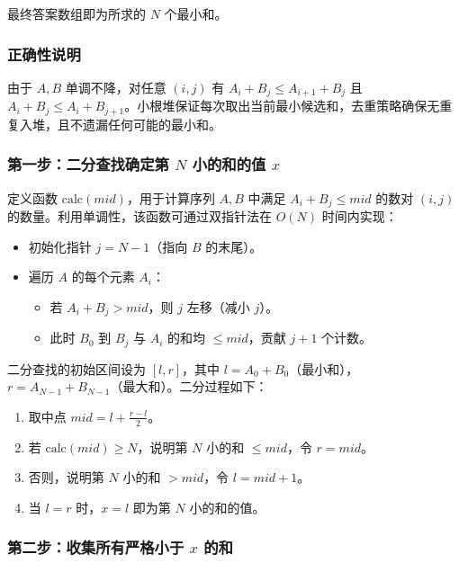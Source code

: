\documentclass[11pt,a4paper,twocolumn]{ctexart}  %
\begin{document}
最终答案数组即为所求的 $N$ 个最小和。

\subsubsection*{正确性说明}

由于 $A, B$ 单调不降，对任意 $(i, j)$ 有 $A_i + B_j \leq A_{i+1} + B_j$ 且 $A_i + B_j \leq A_i + B_{j+1}$。小根堆保证每次取出当前最小候选和，去重策略确保无重复入堆，且不遗漏任何可能的最小和。




\subsubsection*{第一步：二分查找确定第 $N$ 小的和的值 $x$}

定义函数 $\mathrm{calc}(mid)$，用于计算序列 $A, B$ 中满足 $A_i + B_j \leq mid$ 的数对 $(i, j)$ 的数量。利用单调性，该函数可通过双指针法在 $O(N)$ 时间内实现：
\begin{itemize}
    \item 初始化指针 $j = N - 1$（指向 $B$ 的末尾）。
    \item 遍历 $A$ 的每个元素 $A_i$：
    \begin{itemize}
        \item 若 $A_i + B_j > mid$，则 $j$ 左移（减小 $j$）。
        \item 此时 $B_0$ 到 $B_j$ 与 $A_i$ 的和均 $\leq mid$，贡献 $j + 1$ 个计数。
    \end{itemize}
\end{itemize}

二分查找的初始区间设为 $[l, r]$，其中 $l = A_0 + B_0$（最小和），$r = A_{N-1} + B_{N-1}$（最大和）。二分过程如下：
\begin{enumerate}
    \item 取中点 $mid = l + \frac{r - l}{2}$。
    \item 若 $\mathrm{calc}(mid) \geq N$，说明第 $N$ 小的和 $\leq mid$，令 $r = mid$。
    \item 否则，说明第 $N$ 小的和 $> mid$，令 $l = mid + 1$。
    \item 当 $l = r$ 时，$x = l$ 即为第 $N$ 小的和的值。
\end{enumerate}

\subsubsection*{第二步：收集所有严格小于 $x$ 的和}
\end{document}
